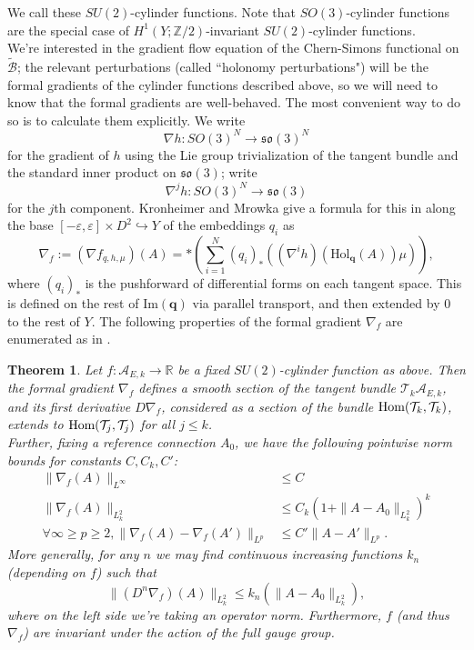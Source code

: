 \documentclass{memo-l}
\newtheorem{theorem}{Theorem}[chapter]
\theoremstyle{definition}
\theoremstyle{remark}
\numberwithin{section}{chapter}
\numberwithin{equation}{chapter}
\begin{document}
We call these $SU(2)$-cylinder functions. Note that $SO(3)$-cylinder functions are the special case of $H^1(Y;\mathbb Z/2)$-invariant $SU(2)$-cylinder functions.\\

We're interested in the gradient flow equation of the Chern-Simons functional on $\widetilde{\mathcal B}$; the relevant perturbations (called ``holonomy perturbations") will be the formal gradients of the cylinder functions described above, so we will need to know that the formal gradients are well-behaved. The most convenient way to do so is to calculate them explicitly. We write 
$$\nabla h: SO(3)^N \to \mathfrak{so}(3)^N$$ 
for the gradient of $h$ using the Lie group trivialization of the tangent bundle and the standard inner product on $\mathfrak{so}(3)$; write 
$$\nabla^j h: SO(3)^N \to \mathfrak{so}(3)$$ 
for the $j$th component. Kronheimer and Mrowka give a formula for this in \cite[Equation~(74)]{KM1} along the base $[-\varepsilon, \varepsilon] \times D^2 \hookrightarrow Y$ of the embeddings $q_i$ as $$\nabla_f := (\nabla f_{q,h,\mu})(A) = \ast \left(\sum_{i=1}^N (q_i)_* ((\nabla^i h)(\text{Hol}_{\mathbf{q}}(A)) \mu)\right),$$ where $(q_i)_*$ is the pushforward of differential forms on each tangent space. This is defined on the rest of $\text{Im}(\mathbf{q})$ via parallel transport, and then extended by 0 to the rest of $Y$. The following properties of the formal gradient $\nabla_f$ are enumerated as in \cite[Proposition~3.5]{KM1}.

\begin{theorem}\label{pert}Let $f: \mathcal A_{E,k}\to \mathbb R$ be a fixed $SU(2)$-cylinder function as above. Then the formal gradient $\nabla_f$ defines a smooth section of the tangent bundle $\mathcal T_k \mathcal A_{E,k}$, and its first derivative $D\nabla_f$, considered as a section of the bundle $\textup{Hom}(\mathcal T_k, \mathcal T_k)$, extends to $\textup{Hom}(\mathcal T_j, \mathcal T_j)$ for all $j \leq k$.\\
Further, fixing a reference connection $A_0$, we have the following pointwise norm bounds for constants $C, C_k, C'$:
\begin{align*}\|\nabla_f(A)\|_{L^\infty} &\leq C \\
\|\nabla_f(A)\|_{L^2_k} &\leq C_k(1+\|A-A_0\|_{L^2_k})^k\\
\forall \infty \geq p\geq 2, \|\nabla_f(A) - \nabla_f(A')\|_{L^p} &\leq C' \|A - A'\|_{L^p}.
\end{align*}
More generally, for any $n$ we may find continuous increasing functions $k_n$ (depending on $f$) such that $$\|(D^n \nabla_f)(A)\|_{L^2_k} \leq k_n(\|A - A_0\|_{L^2_k}),$$ where on the left side we're taking an operator norm. Furthermore, $f$ (and thus $\nabla_f$) are invariant under the action of the full gauge group.
\end{theorem}
\end{document}
